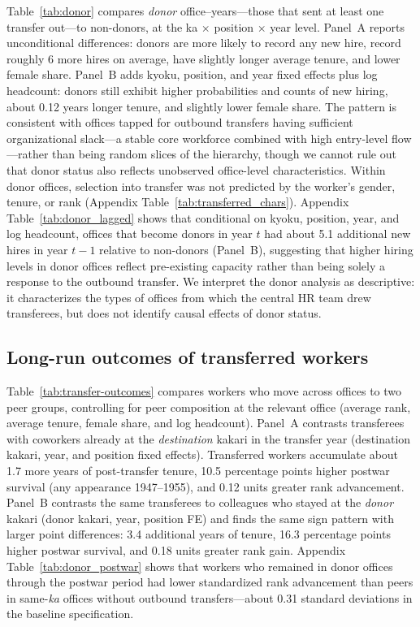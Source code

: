 Table~\ref{tab:donor} compares \emph{donor} office--years---those that sent at least one transfer out---to non-donors, at the ka $\times$ position $\times$ year level. Panel~A reports unconditional differences: donors are more likely to record any new hire, record roughly 6 more hires on average, have slightly longer average tenure, and lower female share. Panel~B adds kyoku, position, and year fixed effects plus log headcount: donors still exhibit higher probabilities and counts of new hiring, about 0.12 years longer tenure, and slightly lower female share. The pattern is consistent with offices tapped for outbound transfers having sufficient organizational slack---a stable core workforce combined with high entry-level flow---rather than being random slices of the hierarchy, though we cannot rule out that donor status also reflects unobserved office-level characteristics. Within donor offices, selection into transfer was not predicted by the worker's gender, tenure, or rank (Appendix Table~\ref{tab:transferred_chars}). Appendix Table~\ref{tab:donor_lagged} shows that conditional on kyoku, position, year, and log headcount, offices that become donors in year $t$ had about 5.1 additional new hires in year $t{-}1$ relative to non-donors (Panel~B), suggesting that higher hiring levels in donor offices reflect pre-existing capacity rather than being solely a response to the outbound transfer. We interpret the donor analysis as descriptive: it characterizes the types of offices from which the central HR team drew transferees, but does not identify causal effects of donor status.

\subsection{Long-run outcomes of transferred workers}

Table~\ref{tab:transfer-outcomes} compares workers who move across offices to two peer groups, controlling for peer composition at the relevant office (average rank, average tenure, female share, and log headcount). Panel~A contrasts transferees with coworkers already at the \emph{destination} kakari in the transfer year (destination kakari, year, and position fixed effects). Transferred workers accumulate about 1.7 more years of post-transfer tenure, 10.5 percentage points higher postwar survival (any appearance 1947--1955), and 0.12 units greater rank advancement. Panel~B contrasts the same transferees to colleagues who stayed at the \emph{donor} kakari (donor kakari, year, position FE) and finds the same sign pattern with larger point differences: 3.4 additional years of tenure, 16.3 percentage points higher postwar survival, and 0.18 units greater rank gain. Appendix Table~\ref{tab:donor_postwar} shows that workers who remained in donor offices through the postwar period had lower standardized rank advancement than peers in same-\emph{ka} offices without outbound transfers---about 0.31 standard deviations in the baseline specification.

